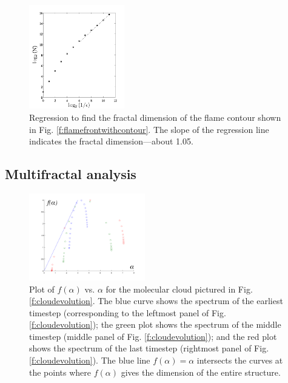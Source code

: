 \documentclass[iop]{emulateapj}
\begin{document}
\begin{figure}[ht]
	\begin{center}
	\includegraphics[width=0.37\textwidth,clip=true]{Graphics/logNvsE.png}
	\caption{Regression to find the fractal dimension of the flame contour shown in Fig. \ref{f:flamefrontwithcontour}. The slope of the regression line indicates the fractal dimension—about 1.05.
	\label{f:logNvsE}}
	\end{center}
	\end{figure} 


\subsection{Multifractal analysis}\label{MultifractalResults}

\begin{figure}[ht]
	\begin{center}
	\includegraphics[width=0.45\textwidth,clip=true]{Graphics/falphaclouds.png}
	\caption{Plot of $f(\alpha)$ vs. $\alpha$ for the molecular cloud pictured in Fig. \ref{f:cloudevolution}. The blue curve shows the spectrum of the earliest timestep (corresponding to the leftmost panel of Fig. \ref{f:cloudevolution}); the green plot shows the spectrum of the middle timestep (middle panel of Fig. \ref{f:cloudevolution}); and the red plot shows the spectrum of the last timestep (rightmost panel of Fig. \ref{f:cloudevolution}). The blue line $f(\alpha) = \alpha $ intersects the curves at the points where $f(\alpha)$ gives the dimension of the entire structure.
	\label{f:falphamultifractal}}
	\end{center}
	\end{figure} 
\end{document}
